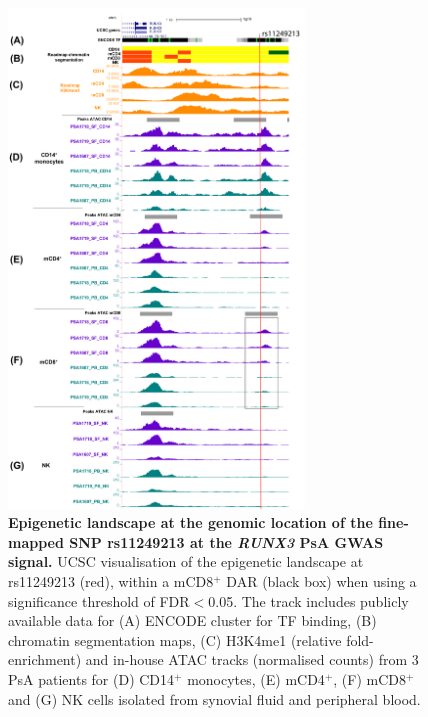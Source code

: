 \begin{figure}[htbp]
\centering
\includegraphics[width=0.7\textwidth]{./Results3/pdfs/PsA_fine_mapping_RUNX3_track}
\caption[Epigenetic landscape at the genomic location of the fine-mapped SNP rs11249213 at the \textit{RUNX3} PsA GWAS signal.]{\textbf{Epigenetic landscape at the genomic location of the fine-mapped SNP rs11249213 at the \textit{RUNX3} PsA GWAS signal.} UCSC visualisation of the epigenetic landscape at rs11249213 (red), within a mCD8$^+$ DAR (black box) when using a significance threshold of FDR$<$0.05. The track includes publicly available data for (A) ENCODE cluster for TF binding, (B) chromatin segmentation maps, (C) H3K4me1 (relative fold-enrichment) and in-house ATAC tracks (normalised counts) from 3 PsA patients for (D) CD14$^+$ monocytes, (E) mCD4$^+$, (F) mCD8$^+$ and (G) NK cells isolated from synovial fluid and peripheral blood.}
\label{figure:RUNX3_fine_mapping_SNPs_epigenetic_track}
\end{figure}



